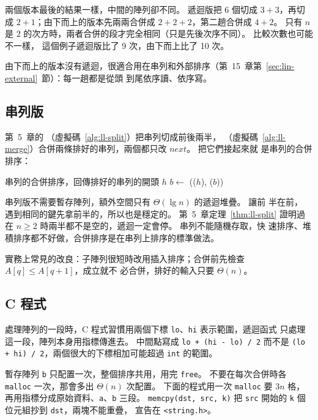 兩個版本最後的結果一樣，中間的陣列卻不同。 遞迴版把 $6$ 個切成 $3 + 3$，再切成
$2 + 1$；由下而上的版本先兩兩合併成 $2 + 2 + 2$，第二趟合併成 $4 + 2$。 只有 $n$ 是
$2$ 的次方時，兩者合併的段才完全相同（只是先後次序不同）。 比較次數也可能不一樣，
這個例子遞迴版比了 9 次，由下而上比了 10 次。

由下而上的版本沒有遞迴，很適合用在串列和外部排序（第~15~章第~\ref{sec:lin-external}~節）：每一趟都是從頭
到尾依序讀、依序寫。

\subsection{串列版}

第~5~章的 （虛擬碼~\ref{alg:ll-split}）把串列切成前後兩半，
（虛擬碼~\ref{alg:ll-merge}）合併兩條排好的串列，兩個都只改 $\mathit{next}$。 把它們接起來就
是串列的合併排序：

\begin{pseudo}[label=alg:so-merge-list]{串列的合併排序，回傳排好的串列的開頭}
        \State \Return $h$
    \EndIf
    \State $b \gets$  
    \State \Return {}(($h$), ($b$))
\EndFunction
\end{pseudo}

串列版不需要暫存陣列，額外空間只有 $\Theta(\lg n)$ 的遞迴堆疊。  讓前
半在前， 遇到相同的鍵先拿前半的，所以也是穩定的。 第~5~章定理~\ref{thm:ll-split} 證明過
 在 $n \ge 2$ 時兩半都不是空的，遞迴一定會停。 串列不能隨機存取，快
速排序、堆積排序都不好做，合併排序是在串列上排序的標準做法。

實務上常見的改良：子陣列很短時改用插入排序；合併前先檢查 $A[q] \le A[q + 1]$，成立就不
必合併，排好的輸入只要 $\Theta(n)$。

\subsection{C 程式}

\begin{cbookrecap}[第~15~章 15.6 節、第~19~章 19.3 節]
處理陣列的一段時，C 程式習慣用兩個下標 \texttt{lo}、\texttt{hi} 表示範圍，遞迴函式
只處理這一段，陣列本身用指標傳進去。 中間點寫成 \texttt{lo + (hi - lo) / 2} 而不是
\texttt{(lo + hi) / 2}，兩個很大的下標相加可能超過 \texttt{int} 的範圍。

暫存陣列 \texttt{b} 只配置一次，整個排序共用，用完 \texttt{free}。 不要在每次合併時各
\texttt{malloc} 一次，那會多出 $\Theta(n)$ 次配置。 下面的程式用一次 \texttt{malloc} 要
$3n$ 格，再用指標分成原始資料、\texttt{a}、\texttt{b} 三段。 \texttt{memcpy(dst,
src, k)} 把 \texttt{src} 開始的 \texttt{k} 個位元組抄到 \texttt{dst}，兩塊不能重疊，
宣告在 \texttt{<string.h>}。
\end{cbookrecap}

